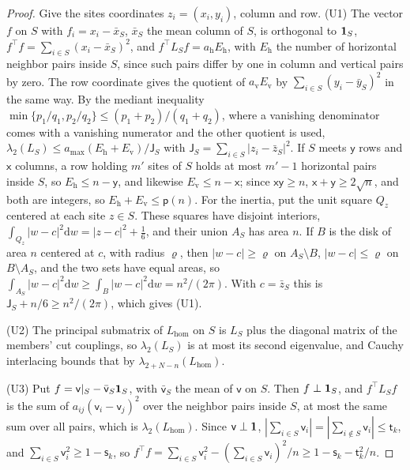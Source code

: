 \begin{proof}
Give the sites coordinates $z_i=(x_i,y_i)$, column and row. (U1) The vector $f$ on $S$ with $f_i=x_i-\bar x_S$, $\bar x_S$ the mean column of $S$, is orthogonal to $\mathbf{1}_S$, $f^\top f=\sum_{i\in S}(x_i-\bar x_S)^2$, and $f^\top L_Sf=a_{\mathrm h}E_{\mathrm h}$, with $E_{\mathrm h}$ the number of horizontal neighbor pairs inside $S$, since such pairs differ by one in column and vertical pairs by zero. The row coordinate gives the quotient of $a_{\mathrm v}E_{\mathrm v}$ by $\sum_{i\in S}(y_i-\bar y_S)^2$ in the same way. By the mediant inequality $\min\{p_1/q_1,p_2/q_2\}\le(p_1+p_2)/(q_1+q_2)$, where a vanishing denominator comes with a vanishing numerator and the other quotient is used, $\lambda_2(L_S)\le a_{\max}(E_{\mathrm h}+E_{\mathrm v})/\mathsf J_S$ with $\mathsf J_S=\sum_{i\in S}|z_i-\bar z_S|^2$. If $S$ meets $\mathsf y$ rows and $\mathsf x$ columns, a row holding $m'$ sites of $S$ holds at most $m'-1$ horizontal pairs inside $S$, so $E_{\mathrm h}\le n-\mathsf y$, and likewise $E_{\mathrm v}\le n-\mathsf x$; since $\mathsf x\mathsf y\ge n$, $\mathsf x+\mathsf y\ge2\sqrt n$, and both are integers, so $E_{\mathrm h}+E_{\mathrm v}\le\mathsf p(n)$. For the inertia, put the unit square $Q_z$ centered at each site $z\in S$. These squares have disjoint interiors, $\int_{Q_z}|w-c|^2\mathrm dw=|z-c|^2+\frac16$, and their union $A_S$ has area $n$. If $B$ is the disk of area $n$ centered at $c$, with radius $\varrho$, then $|w-c|\ge\varrho$ on $A_S\setminus B$, $|w-c|\le\varrho$ on $B\setminus A_S$, and the two sets have equal areas, so $\int_{A_S}|w-c|^2\mathrm dw\ge\int_B|w-c|^2\mathrm dw=n^2/(2\pi)$. With $c=\bar z_S$ this is $\mathsf J_S+n/6\ge n^2/(2\pi)$, which gives (U1).

(U2) The principal submatrix of $L_{\mathrm{hom}}$ on $S$ is $L_S$ plus the diagonal matrix of the members' cut couplings, so $\lambda_2(L_S)$ is at most its second eigenvalue, and Cauchy interlacing bounds that by $\lambda_{2+N-n}(L_{\mathrm{hom}})$.

(U3) Put $f=\mathsf v|_S-\bar{\mathsf v}_S\mathbf{1}_S$, with $\bar{\mathsf v}_S$ the mean of $\mathsf v$ on $S$. Then $f\perp\mathbf{1}_S$, and $f^\top L_Sf$ is the sum of $a_{ij}(\mathsf v_i-\mathsf v_j)^2$ over the neighbor pairs inside $S$, at most the same sum over all pairs, which is $\lambda_2(L_{\mathrm{hom}})$. Since $\mathsf v\perp\mathbf{1}$, $|\sum_{i\in S}\mathsf v_i|=|\sum_{i\notin S}\mathsf v_i|\le\mathsf t_k$, and $\sum_{i\in S}\mathsf v_i^2\ge1-\mathsf s_k$, so $f^\top f=\sum_{i\in S}\mathsf v_i^2-(\sum_{i\in S}\mathsf v_i)^2/n\ge1-\mathsf s_k-\mathsf t_k^2/n$.


\end{proof}

